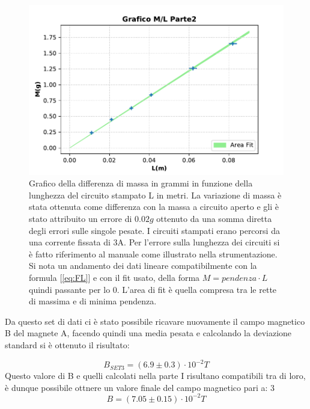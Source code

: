 {\fontsize{12}{18}\selectfont 

\begin{figure}[H]
  \centering
  \includegraphics[width=13.5cm]{Figures/GraficoMLParte2.pdf}
  \caption{Grafico della differenza di massa in grammi in funzione della lunghezza del circuito stampato L in metri. La variazione di massa è stata ottenuta come differenza con la massa a circuito aperto e gli è stato attribuito un errore di $0.02g$ ottenuto da una somma diretta degli errori sulle singole pesate. I circuiti stampati erano percorsi da una corrente fissata di 3A. Per l'errore sulla lunghezza dei circuiti si è fatto riferimento al manuale come illustrato nella strumentazione. Si nota un andamento dei dati lineare compatibilmente con la formula [\ref{eq:FL}] e con il fit usato, della forma $M = pendenza \cdot L$ quindi passante per lo 0. L'area di fit è quella compresa tra le rette di massima e di minima pendenza.}   
  \label{fig:GraficoParteII}
\end{figure}
Da questo set di dati ci è stato possibile ricavare nuovamente il campo magnetico B del magnete A, facendo quindi una media pesata e calcolando la deviazione standard si è ottenuto il risultato:

\par
\begin{equation*}
    B_{SET3} = (6.9 \pm 0.3)\cdot 10^{-2}T
\end{equation*}
Questo valore di B e quelli calcolati nella parte I risultano compatibili tra di loro, è dunque possibile ottnere un valore finale del campo magnetico pari a:
3
\begin{equation*}
    B = (7.05 \pm 0.15)\cdot 10^{-2}T 
\end{equation*}

\par}